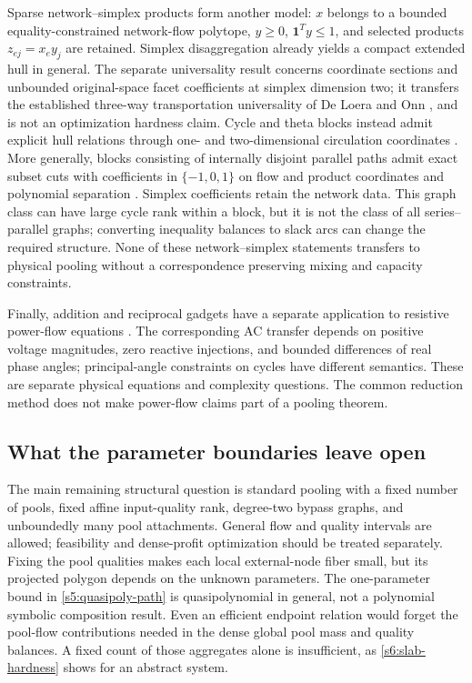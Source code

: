Sparse network--simplex products form another model:
$x$ belongs to a bounded equality-constrained network-flow polytope,
$y\ge0$, $\mathbf1^Ty\le1$, and selected products $z_{ej}=x_ey_j$
are retained. Simplex disaggregation already yields a compact extended
hull in general. The separate universality result
\cite{s6:network-universality-note} concerns coordinate sections and
unbounded original-space facet coefficients at simplex dimension two;
it transfers the established three-way transportation universality of
De Loera and Onn \cite{s6:deloera2006}, and is not an optimization
hardness claim. Cycle and theta blocks instead admit explicit hull
relations through one- and two-dimensional circulation coordinates
\cite{s6:network-cycle-note}. More generally, blocks consisting of
internally disjoint parallel paths admit exact subset cuts with
coefficients in $\{-1,0,1\}$ on flow and product coordinates and
polynomial separation \cite{s6:network-parallel-note}. Simplex
coefficients retain the network data. This graph class can have large
cycle rank within a block, but it is not the class of all series--parallel
graphs; converting inequality balances to slack arcs can change the
required structure. None of these network--simplex statements transfers
to physical pooling without a correspondence preserving mixing and
capacity constraints.

Finally, addition and reciprocal gadgets have a separate application
to resistive power-flow equations \cite{s6:power-note}. The corresponding
AC transfer depends on positive voltage magnitudes, zero reactive
injections, and bounded differences of real phase angles; principal-angle
constraints on cycles have different semantics. These are separate
physical equations and complexity questions. The common reduction
method does not make power-flow claims part of a pooling theorem.

\subsection{What the parameter boundaries leave open}\label{s6:open}
The main remaining structural question is standard pooling with a fixed
number of pools, fixed affine input-quality rank, degree-two bypass
graphs, and unboundedly many pool attachments. General flow and quality
intervals are allowed; feasibility and dense-profit optimization should
be treated separately. Fixing the pool qualities makes each local
external-node fiber small, but its projected polygon depends on the
unknown parameters. The one-parameter bound in \cref{s5:quasipoly-path}
is quasipolynomial in general, not a polynomial symbolic composition
result. Even an efficient endpoint relation would forget the pool-flow
contributions needed in the dense global pool mass and quality balances.
A fixed count of those aggregates alone is insufficient, as
\cref{s6:slab-hardness} shows for an abstract system.

